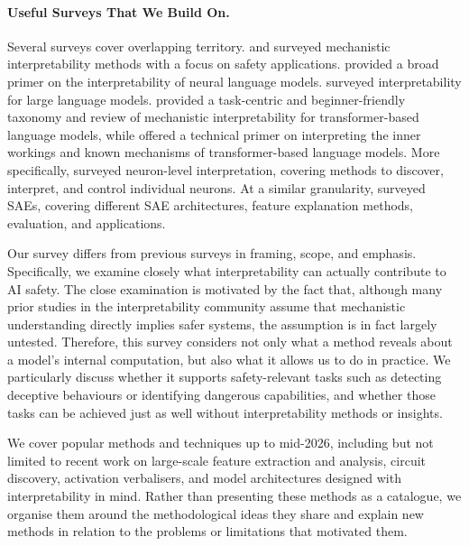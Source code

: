 \paragraph{Useful Surveys That We Build On.}
Several surveys cover overlapping territory.  and  surveyed mechanistic interpretability methods with a focus on safety applications.  provided a broad primer on the interpretability of neural language models.  surveyed interpretability for large language models. 
 provided a task-centric and beginner-friendly taxonomy and review of mechanistic interpretability for transformer-based language models, while  offered a technical primer on interpreting the inner workings and known mechanisms of transformer-based language models. More specifically,  surveyed neuron-level interpretation, covering methods to discover, interpret, and control individual neurons. At a similar granularity,  surveyed SAEs, covering different SAE architectures, feature explanation methods, evaluation, and applications.

Our survey differs from previous surveys in framing, scope, and emphasis. Specifically, we examine closely what interpretability can actually contribute to AI safety. The close examination is motivated by the fact that, although many prior studies in the interpretability community assume that mechanistic understanding directly implies safer systems, the assumption is in fact largely untested. Therefore, this survey considers not only what a method reveals about a model's internal computation, but also what it allows us to do in practice. We particularly discuss whether it supports safety-relevant tasks such as detecting deceptive behaviours or identifying dangerous capabilities, and whether those tasks can be achieved just as well without interpretability methods or insights.

We cover popular methods and techniques up to mid-2026, including but not limited to recent work on large-scale feature extraction and analysis, circuit discovery, activation verbalisers, and model architectures designed with interpretability in mind. Rather than presenting these methods as a catalogue, we organise them around the methodological ideas they share and explain new methods in relation to the problems or limitations that motivated them.

